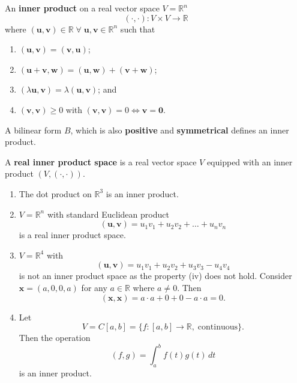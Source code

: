 \begin{definition}
    An \textbf{inner product} on a real vector space $V = \mathbb{R}^n$ \[ ( \cdot , \cdot ) : V \times V \to \mathbb{R} \] where $(\bm{u}, \bm{v}) \in \mathbb{R} \; \forall \; \bm{u}, \bm{v} \in \mathbb{R}^n$ such that
    \begin{enumerate}
        \item $(\bm{u}, \bm{v}) = (\bm{v}, \bm{u})$;
        \item $(\bm{u} + \bm{v}, \bm{w}) = (\bm{u}, \bm{w}) + (\bm{v} + \bm{w})$;
        \item $(\lambda \bm{u}, \bm{v}) = \lambda (\bm{u}, \bm{v})$; and
        \item $(\bm{v}, \bm{v}) \geq 0$ with $(\bm{v}, \bm{v}) = 0 \iff \bm{v} = \bm{0}$.
    \end{enumerate}
\end{definition}

\begin{remark}
    A bilinear form $B$, which is also \textbf{positive} and \textbf{symmetrical} defines an inner product.
\end{remark}

\begin{definition}
    A \textbf{real inner product space} is a real vector space $V$ equipped with an inner product $(V, (\cdot, \cdot))$.
\end{definition}

\begin{example}
    \begin{enumerate}
        \item The dot product on $\mathbb{R}^3$ is an inner product.
        
        \item $V = \mathbb{R}^n$ with standard Euclidean product \[ (\bm{u}, \bm{v}) = u_1 v_1 + u_2 v_2 + \ldots + u_n v_n \] is a real inner product space.
        
        \item $V = \mathbb{R}^4$ with \[ (\bm{u}, \bm{v}) = u_1 v_1 + u_2 v_2 + u_3 v_3 - u_4 v_4 \] is not an inner product space as the property (iv) does not hold. Consider $\bm{x} = (a, 0, 0, a)$ for any $a \in \mathbb{R}$ where $a \neq 0$. Then \[ (\bm{x}, \bm{x}) = a \cdot a + 0 + 0 - a \cdot a = 0. \]
        
        \item Let \[ V = C[a, b] = \{ f : [a, b] \to \mathbb{R}, \; \text{continuous} \}. \] Then the operation \[ (f, g) = \int_a^b f(t) g(t) \, dt \] is an inner product.
    \end{enumerate}
\end{example}


